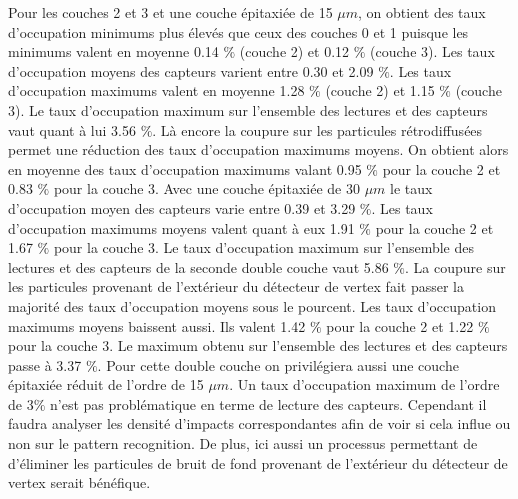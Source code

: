    Pour les couches 2 et 3 et une couche \'epitaxi\'ee de 15 $\mu m$, on obtient des taux d'occupation minimums plus \'elev\'es que ceux des couches 0 et 1 puisque les minimums valent en moyenne 0.14 $\%$ (couche 2) et 0.12 $\%$ (couche 3). Les taux d'occupation moyens des capteurs varient entre 0.30 et 2.09 $\%$. Les taux d'occupation maximums valent en moyenne 1.28 $\%$ (couche 2) et 1.15 $\%$ (couche 3). Le taux d'occupation maximum sur l'ensemble des lectures et des capteurs vaut quant \`a lui 3.56 $\%$. L\`a encore la coupure sur les particules r\'etrodiffus\'ees permet une r\'eduction des taux d'occupation maximums moyens. On obtient alors en moyenne des taux d'occupation maximums valant 0.95 $\%$ pour la couche 2 et 0.83 $\%$ pour la couche 3. Avec une couche \'epitaxi\'ee de 30 $\mu m$ le taux d'occupation moyen des capteurs varie entre 0.39 et 3.29 $\%$. Les taux d'occupation maximums moyens valent quant \`a eux 1.91 $\%$ pour la couche 2 et 1.67 $\%$ pour la couche 3. Le taux d'occupation maximum sur l'ensemble des lectures et des capteurs de la seconde double couche vaut 5.86 $\%$. La coupure sur les particules provenant de l'ext\'erieur du d\'etecteur de vertex fait passer la majorit\'e des taux d'occupation moyens sous le pourcent. Les taux d'occupation maximums moyens baissent aussi. Ils valent 1.42 $\%$ pour la couche 2 et 1.22 $\%$ pour la couche 3. Le maximum obtenu sur l'ensemble des lectures et des capteurs passe \`a 3.37 $\%$. Pour cette double couche on privil\'egiera aussi une couche \'epitaxi\'ee r\'eduit de l'ordre de 15 $\mu m$. Un taux d'occupation maximum de l'ordre de 3$\%$ n'est pas probl\'ematique en terme de lecture des capteurs. Cependant il faudra analyser les densit\'e d'impacts correspondantes afin de voir si cela influe ou non sur le pattern recognition. De plus, ici aussi un processus permettant de d'\'eliminer les particules de bruit de fond provenant de l'ext\'erieur du d\'etecteur de vertex serait b\'en\'efique.
   
   \medskip
   
